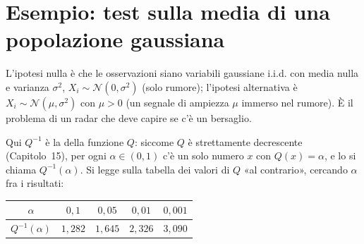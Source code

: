 \section{Esempio: test sulla media di una popolazione gaussiana}

L'ipotesi nulla è che le osservazioni siano variabili gaussiane i.i.d. con media nulla e varianza $\sigma^2$,
$X_i \sim \mathcal{N}(0, \sigma^2)$ (solo rumore); l'ipotesi alternativa è $X_i \sim \mathcal{N}(\mu, \sigma^2)$ con
$\mu > 0$ (un segnale di ampiezza $\mu$ immerso nel rumore). È il problema di un radar che deve capire se c'è un
bersaglio.


Qui $Q^{-1}$ è la  della funzione $Q$: siccome $Q$ è strettamente decrescente (Capitolo~15), per
ogni $\alpha \in (0, 1)$ c'è un solo numero $x$ con $Q(x) = \alpha$, e lo si chiama $Q^{-1}(\alpha)$. Si legge sulla
tabella dei valori di $Q$ «al contrario», cercando $\alpha$ fra i risultati:
\begin{center}
\renewcommand{\arraystretch}{1.25}
\begin{tabular}{@{}c|cccc@{}}
  $\alpha$ & $0{,}1$ & $0{,}05$ & $0{,}01$ & $0{,}001$ \\ \hline
  $Q^{-1}(\alpha)$ & $1{,}282$ & $1{,}645$ & $2{,}326$ & $3{,}090$
\end{tabular}
\end{center}

